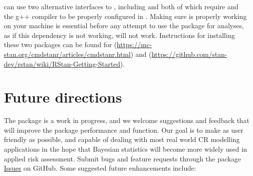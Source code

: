 \documentclass[
  shortnames]{jss}
\begin{document}
 can use two alternative interfaces to , including  \citep{rstan2021} and  \citep{cmdstanr2022}
both of which require  and the g++ compiler to be properly configured in .
Making sure  is properly working on your machine is essential before any
attempt to use the  package for analyses, as if this dependency is not
working,  will not work. Instructions for installing these two packages can be found for  (\url{https://mc-stan.org/cmdstanr/articles/cmdstanr.html}) and  (\url{https://github.com/stan-dev/rstan/wiki/RStan-Getting-Started}).

\hypertarget{future-directions}{%
\section{Future directions}\label{future-directions}}

The  package is a work in progress, and we welcome suggestions and feedback that will improve the package performance and function. Our goal is to make  as user friendly as possible, and capable of dealing with most real world CR modelling applications in the hope that Bayesian statistics will become more widely used in applied risk assessment. Submit bugs and feature requests through the package \href{https://github.com/open-AIMS/bayesnec/issues}{Issues} on GitHub. Some suggested future enhancements include:
\end{document}
